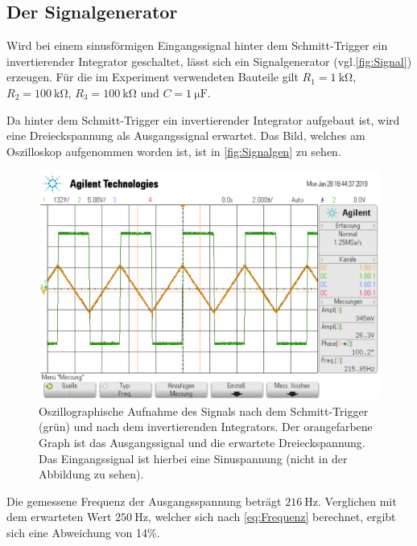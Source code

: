 \clearpage
\subsection{Der Signalgenerator \cite{signal}}
Wird bei einem sinusförmigen Eingangssignal hinter dem Schmitt-Trigger ein invertierender Integrator geschaltet, lässt sich 
ein Signalgenerator (vgl.\autoref{fig:Signal}) erzeugen. 
Für die im Experiment verwendeten Bauteile gilt $R_1 = \SI{1}{\kilo\ohm}$, $R_2 = \SI{100}{\kilo\ohm}$,
$R_3 = \SI{100}{\kilo\ohm}$ und $C = \SI{1}{\micro\farad}$.\cite{signal}

Da hinter dem Schmitt-Trigger ein invertierender Integrator aufgebaut ist, wird eine Dreieckspannung
als Ausgangssignal erwartet.
Das Bild, welches am Oszilloskop aufgenommen worden ist, ist in \autoref{fig:Signalgen}
zu sehen.
\begin{figure}
    \centering
    \includegraphics[width=0.7\linewidth]{data_of_others_cuz_ours_suck/Signal/Bildschirmfoto vom 2022-02-11 13-19-10.png}
    \caption{Oszillographische Aufnahme des Signals nach dem Schmitt-Trigger (grün) und 
    nach dem invertierenden Integrators. Der orangefarbene Graph ist das Ausgangssignal und die erwartete
    Dreieckspannung.\cite{signal} Das Eingangssignal ist hierbei eine Sinuspannung (nicht in der Abbildung zu sehen).}
    \label{fig:Signalgen}
\end{figure}
\FloatBarrier

Die gemessene Frequenz der Ausgangsspannung beträgt $\SI{216}{\hertz}$.
Verglichen mit dem erwarteten Wert $\SI{250}{\hertz}$, welcher sich nach \autoref{eq:Frequenz}
berechnet, ergibt sich eine Abweichung von 14\%.

%
